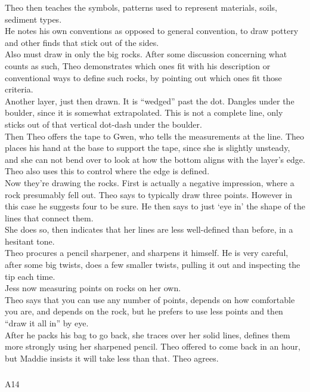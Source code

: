 \documentclass[
]{article}
\makeatletter
\let\oldsubparagraph\subparagraph
\renewcommand{\subparagraph}{
    \@ifstar
      \xxxSubParagraphStar
      \xxxSubParagraphNoStar
  }
\newcommand{\xxxSubParagraphStar}[1]{\oldsubparagraph*{#1}\mbox{}}
\newcommand{\xxxSubParagraphNoStar}[1]{\oldsubparagraph{#1}\mbox{}}
\makeatother
\begin{document}
Theo then teaches the symbols, patterns used to represent materials,
soils, sediment types.\\
He notes his own conventions as opposed to general convention, to draw
pottery and other finds that stick out of the sides.\\
Also must draw in only the big rocks. After some discussion concerning
what counts as such, Theo demonstrates which ones fit with his
description or conventional ways to define such rocks, by pointing out
which ones fit those criteria.\\
Another layer, just then drawn. It is ``wedged'' past the dot. Dangles
under the boulder, since it is somewhat extrapolated. This is not a
complete line, only sticks out of that vertical dot-dash under the
boulder.\\
Then Theo offers the tape to Gwen, who tells the measurements at the
line. Theo places his hand at the base to support the tape, since she is
slightly unsteady, and she can not bend over to look at how the bottom
aligns with the layer's edge. Theo also uses this to control where the
edge is defined.\\
Now they're drawing the rocks. First is actually a negative impression,
where a rock presumably fell out. Theo says to typically draw three
points. However in this case he suggests four to be sure. He then says
to just `eye in' the shape of the lines that connect them.\\
She does so, then indicates that her lines are less well-defined than
before, in a hesitant tone.\\
Theo procures a pencil sharpener, and sharpens it himself. He is very
careful, after some big twists, does a few smaller twists, pulling it
out and inspecting the tip each time.\\
Jess now measuring points on rocks on her own.\\
Theo says that you can use any number of points, depends on how
comfortable you are, and depends on the rock, but he prefers to use less
points and then ``draw it all in'' by eye.\\
After he packs his bag to go back, she traces over her solid lines,
defines them more strongly using her sharpened pencil. Theo offered to
come back in an hour, but Maddie insists it will take less than that.
Theo agrees.

\subparagraph{A14}\label{sec-A14}
\end{document}
